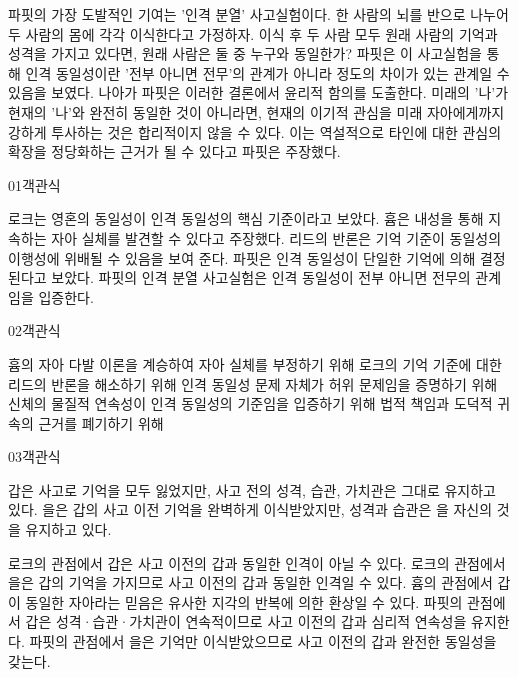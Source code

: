 \documentclass[fs85,seriesWit]{korfarm-base}
\begin{document}
{파핏의 가장 도발적인 기여는 '인격 분열' 사고실험이다. 한 사람의 뇌를 반으로 나누어 두 사람의 몸에 각각 이식한다고 가정하자. 이식 후 두 사람 모두 원래 사람의 기억과 성격을 가지고 있다면, 원래 사람은 둘 중 누구와 동일한가? 파핏은 이 사고실험을 통해 인격 동일성이란 '전부 아니면 전무'의 관계가 아니라 정도의 차이가 있는 관계일 수 있음을 보였다. 나아가 파핏은 이러한 결론에서 윤리적 함의를 도출한다. 미래의 '나'가 현재의 '나'와 완전히 동일한 것이 아니라면, 현재의 이기적 관심을 미래 자아에게까지 강하게 투사하는 것은 합리적이지 않을 수 있다. 이는 역설적으로 타인에 대한 관심의 확장을 정당화하는 근거가 될 수 있다고 파핏은 주장했다.
}\kfResetAreaFlag
{}

\kfBeginMC
\begin{kfQBlock}{01}{객관식}
\begin{kfChoices}
\kfChoice 로크는 영혼의 동일성이 인격 동일성의 핵심 기준이라고 보았다.
\kfChoice 흄은 내성을 통해 지속하는 자아 실체를 발견할 수 있다고 주장했다.
\kfChoice 리드의 반론은 기억 기준이 동일성의 이행성에 위배될 수 있음을 보여 준다.
\kfChoice 파핏은 인격 동일성이 단일한 기억에 의해 결정된다고 보았다.
\kfChoice 파핏의 인격 분열 사고실험은 인격 동일성이 전부 아니면 전무의 관계임을 입증한다.
\end{kfChoices}
\end{kfQBlock}

\begin{kfQBlock}{02}{객관식}
\begin{kfChoices}
\kfChoice 흄의 자아 다발 이론을 계승하여 자아 실체를 부정하기 위해
\kfChoice 로크의 기억 기준에 대한 리드의 반론을 해소하기 위해
\kfChoice 인격 동일성 문제 자체가 허위 문제임을 증명하기 위해
\kfChoice 신체의 물질적 연속성이 인격 동일성의 기준임을 입증하기 위해
\kfChoice 법적 책임과 도덕적 귀속의 근거를 폐기하기 위해
\end{kfChoices}
\end{kfQBlock}

\begin{kfQBlock}{03}{객관식}
\begin{kfEvidence}갑은 사고로 기억을 모두 잃었지만, 사고 전의 성격, 습관, 가치관은 그대로 유지하고 있다. 을은 갑의 사고 이전 기억을 완벽하게 이식받았지만, 성격과 습관은 을 자신의 것을 유지하고 있다.\end{kfEvidence}
\begin{kfChoices}
\kfChoice 로크의 관점에서 갑은 사고 이전의 갑과 동일한 인격이 아닐 수 있다.
\kfChoice 로크의 관점에서 을은 갑의 기억을 가지므로 사고 이전의 갑과 동일한 인격일 수 있다.
\kfChoice 흄의 관점에서 갑이 동일한 자아라는 믿음은 유사한 지각의 반복에 의한 환상일 수 있다.
\kfChoice 파핏의 관점에서 갑은 성격·습관·가치관이 연속적이므로 사고 이전의 갑과 심리적 연속성을 유지한다.
\kfChoice 파핏의 관점에서 을은 기억만 이식받았으므로 사고 이전의 갑과 완전한 동일성을 갖는다.
\end{kfChoices}
\end{kfQBlock}
\end{document}
